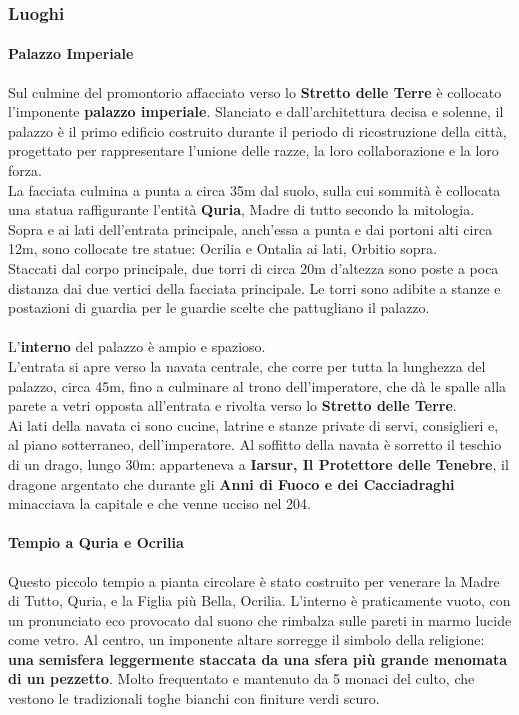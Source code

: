 \documentclass[10pt,twoside,onecolumn,openany]{book}
\begin{document}
\subsubsection{Luoghi}
\paragraph{Palazzo Imperiale}
Sul culmine del promontorio affacciato verso lo \textbf{Stretto delle Terre} è collocato l'imponente \textbf{palazzo imperiale}. Slanciato e dall'architettura decisa e solenne, il palazzo è il primo edificio costruito durante il periodo di ricostruzione della città, progettato per rappresentare l'unione delle razze, la loro collaborazione e la loro forza.\\
La facciata culmina a punta a circa 35m dal suolo, sulla cui sommità è collocata una statua raffigurante l'entità \textbf{Quria}, Madre di tutto secondo la mitologia. Sopra e ai lati dell'entrata principale, anch'essa a punta e dai portoni alti circa 12m, sono collocate tre statue: Ocrilia e Ontalia ai lati, Orbitio sopra.\\
Staccati dal corpo principale, due torri di circa 20m d'altezza sono poste a poca distanza dai due vertici della facciata principale. Le torri sono adibite a stanze e postazioni di guardia per le guardie scelte che pattugliano il palazzo.\\
\\
L'\textbf{interno} del palazzo è ampio e spazioso.\\
L'entrata si apre verso la navata centrale, che corre per tutta la lunghezza del palazzo, circa 45m, fino a culminare al trono dell'imperatore, che dà le spalle alla parete a vetri opposta all'entrata e rivolta verso lo \textbf{Stretto delle Terre}.\\
Ai lati della navata ci sono cucine, latrine e stanze private di servi, consiglieri e, al piano sotterraneo, dell'imperatore. Al soffitto della navata è sorretto il teschio di un drago, lungo 30m: apparteneva a \textbf{Iarsur, Il Protettore delle Tenebre}, il dragone argentato che durante gli \textbf{Anni di Fuoco e dei Cacciadraghi} minacciava la capitale e che venne ucciso nel 204.
\paragraph{Tempio a Quria e Ocrilia}
Questo piccolo tempio a pianta circolare è stato costruito per venerare la Madre di Tutto, Quria, e la Figlia più Bella, Ocrilia. L'interno è praticamente vuoto, con un pronunciato eco provocato dal suono che rimbalza sulle pareti in marmo lucide come vetro. Al centro, un imponente altare sorregge il simbolo della religione: \textbf{una semisfera leggermente staccata da una sfera più grande menomata di un pezzetto}. Molto frequentato e mantenuto da 5 monaci del culto, che vestono le tradizionali toghe bianchi con finiture verdi scuro.
\end{document}
